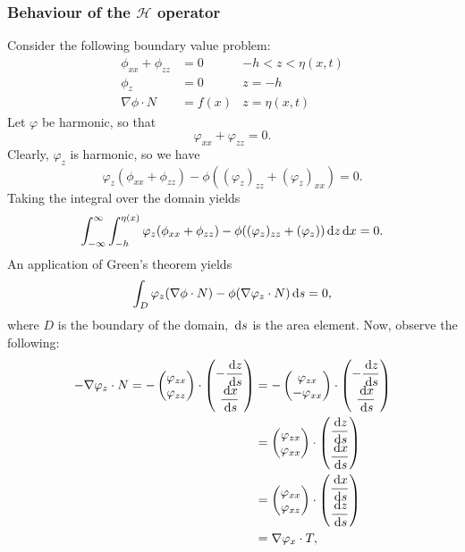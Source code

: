 \documentclass[10pt,reqno,oneside,a4paper]{article}
\begin{document}
\subsubsection{Behaviour of the $\mathcal{H}$ operator}
Consider the following boundary value problem:
\begin{subequations}
\begin{align}
\phi_{xx} + \phi_{zz} &= 0 &-h < z < \eta(x,t) \\
\phi_{z} &= 0 &z = -h \\
\nabla  \phi \cdot N &= f(x )& z = \eta(x,t)
\end{align}
\end{subequations}
Let $\varphi$ be harmonic, so that 
\[ \varphi_{xx} + \varphi_{zz} = 0. \] Clearly, $\varphi_z$ is harmonic, so we have
\[ \varphi_z(\phi_{xx} + \phi_{zz}) - \phi((\varphi_z)_{zz} + (\varphi_{z})_{xx}) = 0. \]
Taking the integral over the domain yields
\[ \int^{\infty}_{-\infty} \int^{\eta(x)}_{-h} \varphi_z(\phi_{xx} + \phi_{zz}) - \phi((\varphi_z)_{zz} + (\varphi_{z})) \,\mathrm{d} z \,\mathrm{d} x = 0.\]
An application of Green's theorem yields 
\[ \int_D \varphi_z(\nabla  \phi \cdot N) - \phi(\nabla  \varphi_z \cdot N) \,\mathrm{d} s = 0,\]
where $D$ is the boundary of the domain, $\,\mathrm{d} s$ is the area element. Now, observe the following:
\begin{align*}
- \nabla  \varphi_z \cdot N = - \begin{pmatrix} \varphi_{zx} \\ \varphi_{zz} \end{pmatrix} \cdot \begin{pmatrix} - \dfrac{\,\mathrm{d} z}{\,\mathrm{d} s} \\ \dfrac{\,\mathrm{d} x}{\,\mathrm{d} s} \end{pmatrix} &=  - \begin{pmatrix} \varphi_{zx} \\ - \varphi_{xx} \end{pmatrix} \cdot \begin{pmatrix} - \dfrac{\,\mathrm{d} z}{\,\mathrm{d} s} \\ \dfrac{\,\mathrm{d} x}{\,\mathrm{d} s} \end{pmatrix} \\
&= \begin{pmatrix} \varphi_{zx} \\ \varphi_{xx} \end{pmatrix} \cdot \begin{pmatrix} \dfrac{\,\mathrm{d} z}{\,\mathrm{d} s} \\ \dfrac{\,\mathrm{d} x}{\,\mathrm{d} s} \end{pmatrix} \\
&= \begin{pmatrix} \varphi_{xx} \\ \varphi_{xz} \end{pmatrix} \cdot \begin{pmatrix} \dfrac{\,\mathrm{d} x}{\,\mathrm{d} s} \\ \dfrac{\,\mathrm{d} z}{\,\mathrm{d} s} \end{pmatrix} \\
&= \nabla  \varphi_x \cdot T,
\end{align*}
\end{document}

